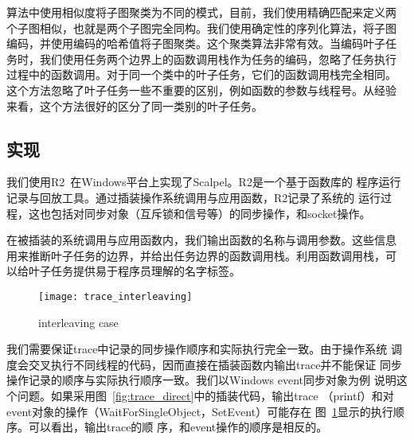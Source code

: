 算法中使用相似度将子图聚类为不同的模式，目前，我们使用精确匹配来定义两
个子图相似，也就是两个子图完全同构。我们使用确定性的序列化算法，将子图
编码，并使用编码的哈希值将子图聚类。这个聚类算法非常有效。当编码叶子任
务时，我们使用任务两个边界上的函数调用栈作为任务的编码，忽略了任务执行
过程中的函数调用。对于同一个类中的叶子任务，它们的函数调用栈完全相同。
这个方法忽略了叶子任务一些不重要的区别，例如函数的参数与线程号。从经验
来看，这个方法很好的区分了同一类别的叶子任务。



\subsection{实现}

我们使用R2~\cite{r2}在Windows平台上实现了Scalpel。R2是一个基于函数库的
程序运行记录与回放工具。通过插装操作系统调用与应用函数，R2记录了系统的
运行过程，这也包括对同步对象（互斥锁和信号等）的同步操作，和socket操作。

在被插装的系统调用与应用函数内，我们输出函数的名称与调用参数。这些信息
用来推断叶子任务的边界，并给出任务边界的函数调用栈。利用函数调用栈，可
以给叶子任务提供易于程序员理解的名字标签。


\begin{figure}
  \centering
  \begin{minipage}{0.8\linewidth}
    \centering
    \texttt{[image: trace\_interleaving]}
    \caption{interleaving case}
    \label{fig:trace_interleaving}
  \end{minipage}
\end{figure}

我们需要保证trace中记录的同步操作顺序和实际执行完全一致。由于操作系统
调度会交叉执行不同线程的代码，因而直接在插装函数内输出trace并不能保证
同步操作记录的顺序与实际执行顺序一致。我们以Windows event同步对象为例
说明这个问题。如果采用图~\ref{fig:trace_direct}中的插装代码，输出trace
（printf）和对event对象的操作（WaitForSingleObject，SetEvent）可能存在
图~\ref{fig:trace_interleaving}显示的执行顺序。可以看出，输出trace的顺
序，和event操作的顺序是相反的。

